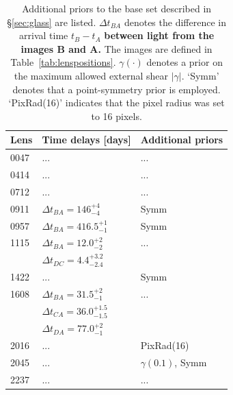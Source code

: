 \documentclass[useAMS,usenatbib]{mn2e}
\newcommand{\cb}[1]{{\color{red} \textbf{#1}}}
\begin{document}
\begin{table}
  \begin{center}
    \begin{tabular}{l l l}
      Lens & Time delays [days] & Additional priors \\ \hline
      0047 & ... & ...\\
      0414 & ... & ...\\
      0712 & ... & ...\\
      0911 & $\Delta t_{BA}=146^{+4}_{-4}$ & Symm\\
      0957 & $\Delta t_{BA}=416.5^{+1}_{-1}$ & Symm \\
      1115 & $\Delta t_{BA}=12.0^{+2}_{-2}$ & ...\\
           & $\Delta t_{DC}=4.4^{+3.2}_{-2.4}$ & \\
      1422 & ... & Symm \\
      1608 & $\Delta t_{BA}=31.5^{+2}_{-1}$ & ...\\
           & $\Delta t_{CA}=36.0^{+1.5}_{-1.5}$ & \\
           & $\Delta t_{DA}=77.0^{+2}_{-1}$ & \\
      2016 & ... & PixRad(16) \\
      2045 & ... & $\gamma(0.1)$, Symm \\
      2237 & ... & ...\\
    \end{tabular}
    \caption[width=\linewidth]{Additional priors to the base set described in \S\ref{sec:glass} are listed. $\Delta t_{BA}$ denotes the difference in arrival time $t_{B}-t_{A}$ \cb{between light from the images B and A.} The images are defined in Table~\ref{tab:lenspositions}. $\gamma(\cdot)$ denotes a prior on the maximum allowed external shear $|\gamma|$. `Symm' denotes that a point-symmetry prior is employed. `PixRad(16)' indicates that the pixel radius was set to 16 pixels.}
    \label{tab:lenspriors}
  \end{center}
\end{table}
\end{document}
